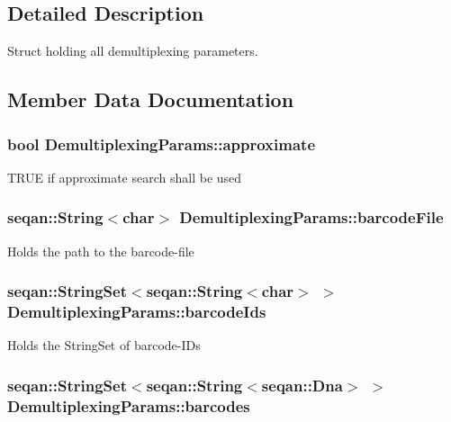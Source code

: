 \subsection{Detailed Description}
Struct holding all demultiplexing parameters. 

\subsection{Member Data Documentation}
\hypertarget{struct_demultiplexing_params_ae76872bea7b75ea020035f7825fc8210}{
\subsubsection[{approximate}]{\setlength{\rightskip}{0pt plus 5cm}bool Demultiplexing\-Params\-::approximate}}\label{struct_demultiplexing_params_ae76872bea7b75ea020035f7825fc8210}
T\-R\-U\-E if approximate search shall be used \hypertarget{struct_demultiplexing_params_a2b2b682fbf21f3ca8daafe3e9b83c0ca}{
\subsubsection[{barcode\-File}]{\setlength{\rightskip}{0pt plus 5cm}seqan\-::\-String$<$char$>$ Demultiplexing\-Params\-::barcode\-File}}\label{struct_demultiplexing_params_a2b2b682fbf21f3ca8daafe3e9b83c0ca}
Holds the path to the barcode-\/file \hypertarget{struct_demultiplexing_params_a1721fa9ad83112b0d2df9c2932bd00be}{
\subsubsection[{barcode\-Ids}]{\setlength{\rightskip}{0pt plus 5cm}seqan\-::\-String\-Set$<$seqan\-::\-String$<$char$>$ $>$ Demultiplexing\-Params\-::barcode\-Ids}}\label{struct_demultiplexing_params_a1721fa9ad83112b0d2df9c2932bd00be}
Holds the String\-Set of barcode-\/\-I\-Ds \hypertarget{struct_demultiplexing_params_aaeea114c00f19f6565047e507a74f90f}{
\subsubsection[{barcodes}]{\setlength{\rightskip}{0pt plus 5cm}seqan\-::\-String\-Set$<$seqan\-::\-String$<$seqan\-::\-Dna$>$ $>$ Demultiplexing\-Params\-::barcodes}}\label{struct_demultiplexing_params_aaeea114c00f19f6565047e507a74f90f}
